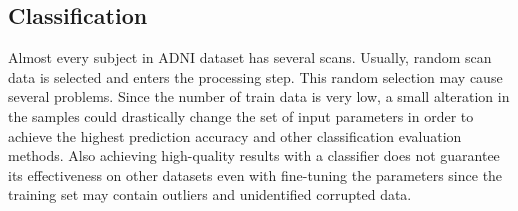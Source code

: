 \documentclass[journal]{IEEEtran}
\begin{document}
	
	

	
%	
	
	
	
	\subsection{Classification}
	
	Almost every subject in ADNI dataset has several scans. Usually, random scan data is selected and enters the processing step\cite{r14}. This random selection may cause several problems. Since the number of train data is very low, a small alteration in the samples could drastically change the set of input parameters in order to achieve the highest prediction accuracy and other classification evaluation methods. Also achieving high-quality results with a classifier does not guarantee its effectiveness on other datasets even with fine-tuning the parameters since the training set may contain outliers and unidentified corrupted data.
	
\end{document}
